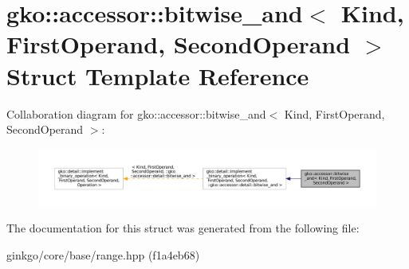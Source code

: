 \hypertarget{structgko_1_1accessor_1_1bitwise__and}{}\section{gko\+:\+:accessor\+:\+:bitwise\+\_\+and$<$ Kind, First\+Operand, Second\+Operand $>$ Struct Template Reference}
\label{structgko_1_1accessor_1_1bitwise__and}


Collaboration diagram for gko\+:\+:accessor\+:\+:bitwise\+\_\+and$<$ Kind, First\+Operand, Second\+Operand $>$\+:
\nopagebreak
\begin{figure}[H]
\begin{center}
\leavevmode
\includegraphics[width=350pt]{structgko_1_1accessor_1_1bitwise__and__coll__graph}
\end{center}
\end{figure}


The documentation for this struct was generated from the following file\+:\begin{DoxyCompactItemize}
\item 
ginkgo/core/base/range.\+hpp (f1a4eb68)\end{DoxyCompactItemize}
